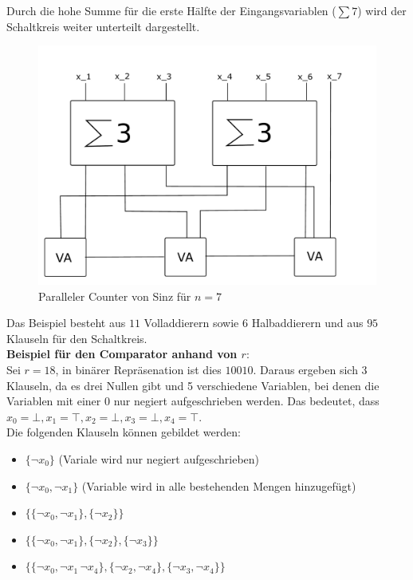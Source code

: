 \documentclass[a4,abstract=on]{scrartcl}
\begin{document}
Durch die hohe Summe für die erste Hälfte der Eingangsvariablen ($\sum7$) wird der Schaltkreis weiter unterteilt dargestellt.

\begin{figure}[H]
\centering
\includegraphics[width=\textwidth]{Bsp_Sinz_fein.pdf}
\caption{Paralleler Counter von Sinz für $n=7$}
\label{fig:sinz_counter_para_bsp}
\end{figure}

Das Beispiel besteht aus $11$ Volladdierern sowie 6 Halbaddierern und aus $95$ Klauseln für den Schaltkreis.\\

\textbf{Beispiel für den Comparator anhand von $r$}:\\
Sei $r = 18$, in binärer Repräsenation ist dies $10010$. Daraus ergeben sich 3 Klauseln, da es drei Nullen gibt und 5 verschiedene Variablen, bei denen die Variablen mit einer $0$ nur negiert aufgeschrieben werden. Das bedeutet, dass $x_0 = \bot, x_1 = \top, x_2 = \bot, x_3 = \bot, x_4 = \top$.\\
Die folgenden Klauseln können gebildet werden:\\
\begin{itemize}
\item $\{\neg x_0\}$ (Variale wird nur negiert aufgeschrieben)
\item  $\{\neg x_0,\neg x_1\}$ (Variable wird in alle bestehenden Mengen hinzugefügt)
\item $\{\{\neg x_0, \neg x_1\},\{\neg x_2\}\}$
\item $\{\{\neg x_0, \neg x_1\},\{\neg x_2\}, \{\neg x_3\}\}$
\item $\{\{\neg x_0, \neg x_1\, \neg x_4\},\{\neg x_2, \neg x_4\}, \{\neg x_3, \neg x_4\}\}$
\end{itemize}
\end{document}
